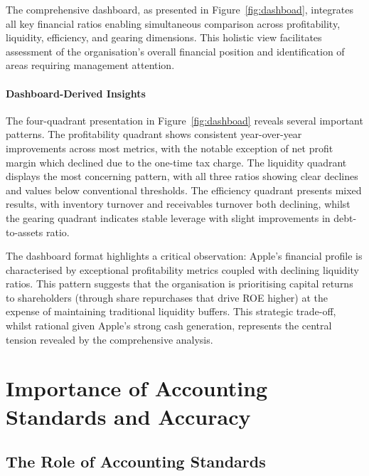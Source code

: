 \documentclass[12pt,a4paper]{article}
\begin{document}
The comprehensive dashboard, as presented in Figure~\ref{fig:dashboad}, integrates all key financial ratios enabling simultaneous comparison across profitability, liquidity, efficiency, and gearing dimensions. This holistic view facilitates assessment of the organisation's overall financial position and identification of areas requiring management attention.

\paragraph{Dashboard-Derived Insights}

The four-quadrant presentation in Figure~\ref{fig:dashboad} reveals several important patterns. The profitability quadrant shows consistent year-over-year improvements across most metrics, with the notable exception of net profit margin which declined due to the one-time tax charge. The liquidity quadrant displays the most concerning pattern, with all three ratios showing clear declines and values below conventional thresholds. The efficiency quadrant presents mixed results, with inventory turnover and receivables turnover both declining, whilst the gearing quadrant indicates stable leverage with slight improvements in debt-to-assets ratio.

The dashboard format highlights a critical observation: Apple's financial profile is characterised by exceptional profitability metrics coupled with declining liquidity ratios. This pattern suggests that the organisation is prioritising capital returns to shareholders (through share repurchases that drive ROE higher) at the expense of maintaining traditional liquidity buffers. This strategic trade-off, whilst rational given Apple's strong cash generation, represents the central tension revealed by the comprehensive analysis.

\section{Importance of Accounting Standards and Accuracy}

\subsection{The Role of Accounting Standards}
\end{document}
